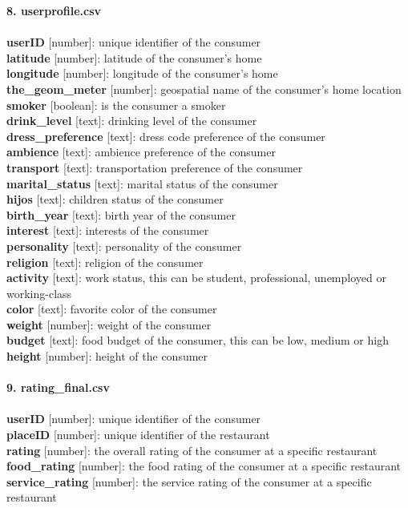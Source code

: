 \textbf{\large 8. userprofile.csv}\\
\\
\textbf{userID} [number]: unique identifier of the consumer\\
\textbf{latitude} [number]: latitude of the consumer's home\\
\textbf{longitude} [number]: longitude of the consumer's home\\
\textbf{the\_geom\_meter} [number]: geospatial name of the consumer's home location\\
\textbf{smoker} [boolean]: is the consumer a smoker\\
\textbf{drink\_level} [text]: drinking level of the consumer\\
\textbf{dress\_preference} [text]: dress code preference of the consumer\\
\textbf{ambience} [text]: ambience preference of the consumer\\
\textbf{transport} [text]: transportation preference of the consumer\\
\textbf{marital\_status} [text]: marital status of the consumer\\
\textbf{hijos} [text]: children status of the consumer\\
\textbf{birth\_year} [text]: birth year of the consumer\\
\textbf{interest} [text]: interests of the consumer\\
\textbf{personality} [text]: personality of the consumer\\
\textbf{religion} [text]: religion of the consumer\\
\textbf{activity} [text]: work status, this can be student, professional, unemployed or working-class\\
\textbf{color} [text]: favorite color of the consumer\\
\textbf{weight} [number]: weight of the consumer\\
\textbf{budget} [text]: food budget of the consumer, this can be low, medium or high\\
\textbf{height} [number]: height of the consumer\\
\\
\textbf{\large 9. rating\_final.csv}\\
\\
\textbf{userID} [number]: unique identifier of the consumer\\
\textbf{placeID} [number]: unique identifier of the restaurant\\
\textbf{rating} [number]: the overall rating of the consumer at a specific restaurant\\
\textbf{food\_rating} [number]: the food rating of the consumer at a specific restaurant\\
\textbf{service\_rating} [number]: the service rating of the consumer at a specific restaurant

